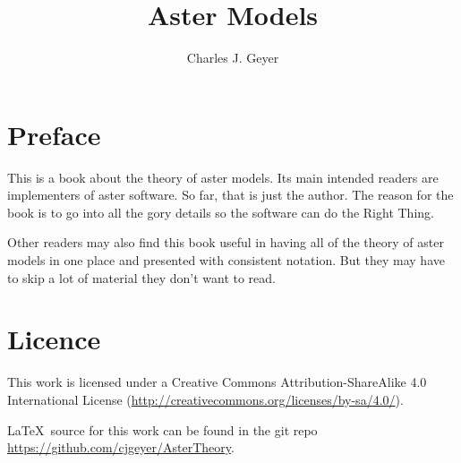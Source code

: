 \documentclass[11pt,oneside]{book}
\begin{document}
\title{Aster Models}

\author{Charles J. Geyer}

\maketitle

\frontmatter

\chapter{Preface}

This is a book about the theory of aster models.  Its main intended
readers are implementers of aster software.  So far, that is just the
author.  The reason for the book is to go into all the gory details
so the software can do the Right Thing.

Other readers may also find this book useful in having all of the theory
of aster models in one place and presented with consistent notation.
But they may have to skip a lot of material they don't want to read.

\chapter{Licence}

This work is licensed under a Creative Commons Attribution-ShareAlike 4.0
International License (\url{http://creativecommons.org/licenses/by-sa/4.0/}).

\LaTeX\ source for this work can be found in the git repo
\url{https://github.com/cjgeyer/AsterTheory}.

\tableofcontents

\mainmatter



\appendix







\printindex
\end{document}

